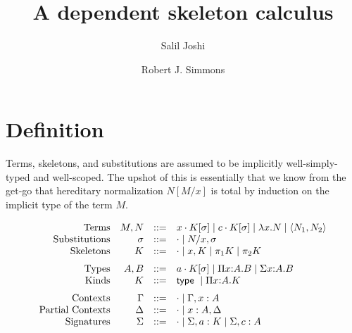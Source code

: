 \documentclass{article}
\begin{document}
\title{A dependent skeleton calculus}
\author{Salil Joshi \and Robert J. Simmons}
\maketitle

\section{Definition}

Terms, skeletons, and substitutions are assumed to be implicitly 
well-simply-typed and well-scoped. The upshot of this is essentially 
that we know from the get-go that hereditary normalization $N[M/x]$ is total 
by induction on the implicit type of the term $M$.

\[
\begin{array}{rrcl}
\mbox{Terms} & M, N & ::= & 
     x \cdot K [ \sigma ] 
\mid c \cdot K [ \sigma ]
\mid \lambda x. N
\mid \langle N_1 , N_2 \rangle 
\\
\mbox{Substitutions} & \sigma & ::= &
     \cdot 
\mid N/x, \sigma
\\
\mbox{Skeletons} & K & ::= &
     \cdot
\mid x, K
\mid \pi_1 K
\mid \pi_2 K
\medskip\\
\mbox{Types} & A,B & ::= &
     a \cdot K [ \sigma ]
\mid \Pi x{:}A.B
\mid \Sigma x{:}A.B
\\
\mbox{Kinds} & K & ::= &
     \mathsf{type} \
\mid \Pi x{:}A.K
\medskip\\
\mbox{Contexts} & \Gamma & ::= & 
     \cdot
\mid \Gamma, x : A
\\
\mbox{Partial Contexts} & \Delta & ::= &
     \cdot
\mid x : A, \Delta
\\
\mbox{Signatures} & \Sigma & ::= &
     \cdot
\mid \Sigma, a : K
\mid \Sigma, c : A
\\
\end{array}
\]
\end{document}
